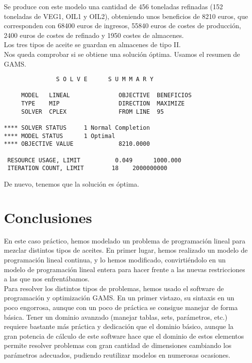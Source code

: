 \documentclass[12pt,a4paper,twoside,openright,titlepage,final]{article}
\begin{document}
Se produce con este modelo una cantidad de 456 toneladas refinadas (152 toneladas de VEG1, OIL1 y OIL2), obteniendo unos beneficios de 8210 euros, que corresponden con 68400 euros de ingresos, 55840 euros de costes de producción, 2400 euros de costes de refinado y 1950 costes de almacenes.\\

Los tres tipos de aceite se guardan en almacenes de tipo II.\\

Nos queda comprobar si se obtiene una solución óptima. Usamos el resumen de GAMS.

\begin{verbatim}
               S O L V E      S U M M A R Y

     MODEL   LINEAL              OBJECTIVE  BENEFICIOS
     TYPE    MIP                 DIRECTION  MAXIMIZE
     SOLVER  CPLEX               FROM LINE  95

**** SOLVER STATUS     1 Normal Completion         
**** MODEL STATUS      1 Optimal                   
**** OBJECTIVE VALUE             8210.0000

 RESOURCE USAGE, LIMIT          0.049      1000.000
 ITERATION COUNT, LIMIT        18    2000000000
\end{verbatim}

De nuevo, tenemos que la solución es óptima.

\section{Conclusiones}

En este caso práctico, hemos modelado un problema de programación lineal para mezclar distintos tipos de aceites. En primer lugar, hemos realizado un modelo de programación lineal continua, y lo hemos modificado, convirtiéndolo en un modelo de programación lineal entera para hacer frente a las nuevas restricciones a las que nos enfrentábamos.\\

Para resolver los distintos tipos de problemas, hemos usado el software de programación y optimización GAMS. En un primer vistazo, su sintaxis en un poco engorrosa, aunque con un poco de práctica se consigue manejar de forma básica. Tener un dominio avanzado (manejar tablas, sets, parámetros, etc.) requiere bastante más práctica y dedicación que el dominio básico, aunque la gran potencia de cálculo de este software hace que el dominio de estos elementos permite resolver problemas con gran cantidad de dimensiones cambiando los parámetros adecuados, pudiendo reutilizar modelos en numerosas ocasiones.
\end{document}
